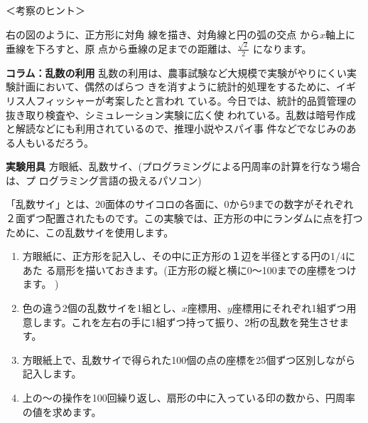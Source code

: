 \bigskip

\hspace*{-\parindent}＜考察のヒント＞

右の図のように、正方形に対角
線を描き、対角線と円の弧の交点
から$x$軸上に垂線を下ろすと、原
点から垂線の足までの距離は、$\frac{\sqrt{2}}{2}$
になります。 



\bigskip

\begin{itembox}[l]{\bf コラム：乱数の利用}
乱数の利用は、農事試験など大規模で実験がやりにくい実験計画において、偶然のばらつ
きを消すように統計的処理をするために、イギリス人フィッシャーが考案したと言われ
ている。今日では、統計的品質管理の抜き取り検査や、シミュレーション実験に広く使
われている。乱数は暗号作成と解読などにも利用されているので、推理小説やスパイ事
件などでなじみのある人もいるだろう。
\end{itembox}

\newpage

\jikken

\begin{itemsquarebox}[c]{\bf 実験用具}
方眼紙、乱数サイ、(プログラミングによる円周率の計算を行なう場合は、プ 
ログラミング言語の扱えるパソコン)
\end{itemsquarebox}

\bigskip


「乱数サイ」とは、20面体のサイコロの各面に、0から9までの数字がそれぞれ 
２面ずつ配置されたものです。この実験では、正方形の中にランダムに点を打つ 
ために、この乱数サイを使用します。

\begin{enumerate}

\item 方眼紙に、正方形を記入し、その中に正方形の１辺を半径とする円の1/4にあた 
る扇形を描いておきます。(正方形の縦と横に0〜100までの座標をつけます。 )

\item 色の違う2個の乱数サイを1組とし、$x$座標用、$y$座標用にそれぞれ1組ずつ用 
意します。これを左右の手に1組ずつ持って振り、2桁の乱数を発生させます。

\item 方眼紙上で、乱数サイで得られた100個の点の座標を25個ずつ区別しながら記入します。

\item 上の〜の操作を100回繰り返し、扇形の中に入っている印の数から、円周率 
の値を求めます。

\end{enumerate}

